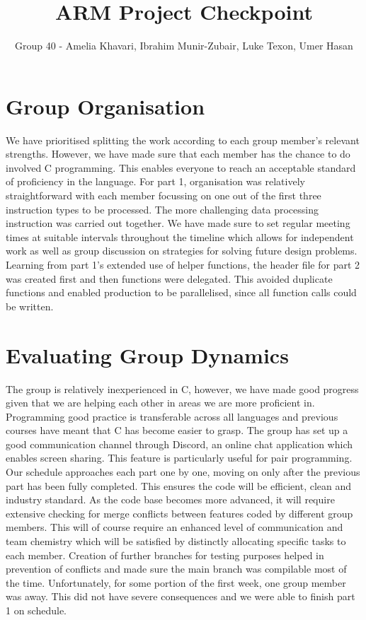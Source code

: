 \documentclass[11pt]{article}
\begin{document}
\title{ARM Project Checkpoint}
\author{Group 40 - Amelia Khavari, Ibrahim Munir-Zubair, Luke Texon, Umer Hasan}

\maketitle

\section{Group Organisation}

We have prioritised splitting the work according to each group member's relevant strengths. However, we have made sure that each member has the chance to do involved C programming. This enables everyone to reach an acceptable standard of proficiency in the language. For part 1, organisation was relatively straightforward with each member focussing on one out of the first three instruction types to be processed. The more challenging data processing instruction was carried out together. We have made sure to set regular meeting times at suitable intervals throughout the timeline which allows for independent work as well as group discussion on strategies for solving future design problems. Learning from part 1's extended use of helper functions, the header file for part 2 was created first and then functions were delegated. This avoided duplicate functions and enabled production to be parallelised, since all function calls could be written.

\section{Evaluating Group Dynamics}

The group is relatively inexperienced in C, however, we have made good progress given that we are helping each other in areas we are more proficient in. Programming good practice is transferable across all languages and previous courses have meant that C has become easier to grasp. The group has set up a good communication channel through Discord, an online chat application which enables screen sharing. This feature is particularly useful for pair programming. Our schedule approaches each part one by one, moving on only after the previous part has been fully completed. This ensures the code will be efficient, clean and industry standard. As the code base becomes more advanced, it will require extensive checking for merge conflicts between features coded by different group members. This will of course require an enhanced level of communication and team chemistry which will be satisfied by distinctly allocating specific tasks to each member. Creation of further branches for testing purposes helped in prevention of conflicts and made sure the main branch was compilable most of the time. Unfortunately, for some portion of the first week, one group member was away. This did not have severe consequences and we were able to finish part 1 on schedule. 
\end{document}
